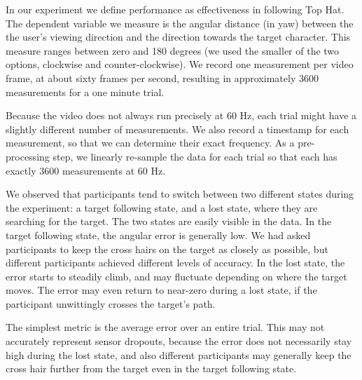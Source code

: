 \documentclass{acmsiggraph}                     %
\begin{document}
In our experiment we define performance as effectiveness in following Top Hat.  The dependent variable we measure is the angular distance (in yaw) between the the user's viewing direction and the direction towards the target character.  This measure ranges between zero and 180 degrees (we used the smaller of the two options, clockwise and counter-clockwise).  We record one measurement per video frame, at about sixty frames per second, resulting in approximately 3600 measurements for a one minute trial.

Because the video does not always run precisely at 60 Hz, each trial might have a slightly different number of measurements.  We also record a timestamp for each measurement, so that we can determine their exact frequency.  As a pre-processing step, we linearly re-sample the data for each trial so that each has exactly 3600 measurements at 60 Hz.

We observed that participants tend to switch between two different states during the experiment: a target following state, and a lost state, where they are searching for the target.  The two states are easily visible in the data.  In the target following state, the angular error is generally low.  We had asked participants to keep the cross hairs on the target as closely as possible, but different participants achieved different levels of accuracy.  In the lost state, the error starts to steadily climb, and may fluctuate depending on where the target moves.  The error may even return to near-zero during a lost state, if the participant unwittingly crosses the target's path.



The simplest metric is the average error over an entire trial.  This may not accurately represent sensor dropouts, because the error does not necessarily stay high during the lost state, and also different participants may generally keep the cross hair further from the target even in the target following state.

\end{document}
